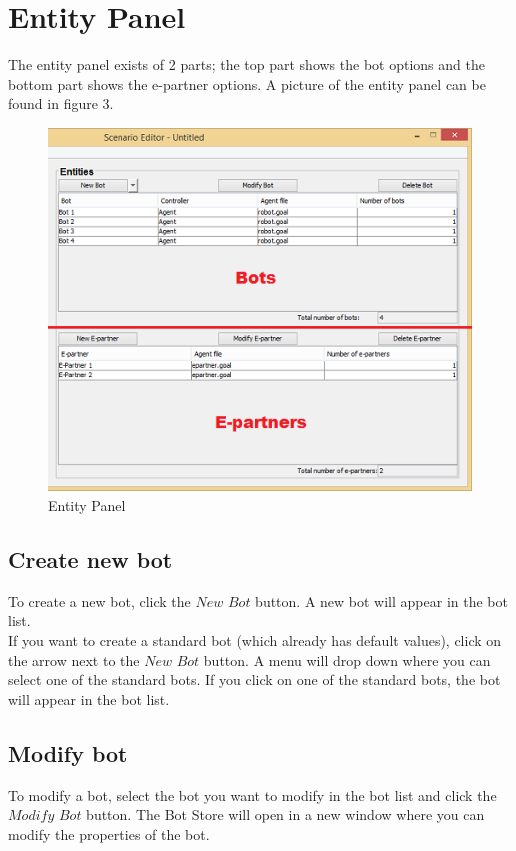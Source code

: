 \documentclass[a4paper]{article}
\begin{document}
\section{Entity Panel}
The entity panel exists of 2 parts; the top part shows the bot options and the bottom part shows the e-partner options. A picture of the entity panel can be found in figure 3.
\begin{figure}[h]
\begin{center}
\includegraphics{bot.png}
\end{center}
\caption{Entity Panel}
\end{figure}
\subsection{Create new bot}
To create a new bot, click the $New$ $Bot$ button. A new bot will appear in the bot list.\\
If you want to create a standard bot (which already has default values), click on the arrow next to the $New$ $Bot$ button. A menu will drop down where you can select one of the standard bots. If you click on one of the standard bots, the bot will appear in the bot list.

\subsection{Modify bot}
To modify a bot, select the bot you want to modify in the bot list and click the $Modify$ $Bot$ button. The Bot Store will open in a new window where you can modify the properties of the bot.
\end{document}
